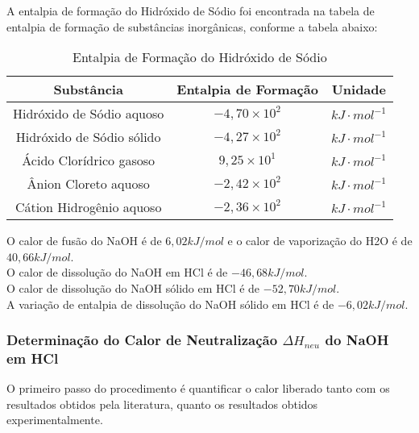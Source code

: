             \indent A entalpia de formação do Hidróxido de Sódio foi encontrada na tabela de entalpia de formação de substâncias inorgânicas, conforme a tabela abaixo:
            \begin{table}[h]
                \centering
                \begin{tabular}{|c|c|c|}
                    \hline
                    \textbf{Substância} & \textbf{Entalpia de Formação} & \textbf{Unidade} \\
                    \hline
                    Hidróxido de Sódio aquoso & $-4,70 \times 10^{2}$ & $kJ \cdot mol^{-1}$ \\
                    \hline
                    Hidróxido de Sódio sólido & $-4,27 \times 10^{2}$ & $kJ \cdot mol^{-1}$ \\
                    \hline
                    Ácido Clorídrico gasoso & $9,25 \times 10^{1}$ & $kJ \cdot mol^{-1}$ \\
                    \hline
                    Ânion Cloreto aquoso & $-2,42 \times 10^{2}$ & $kJ \cdot mol^{-1}$ \\
                    \hline
                    Cátion Hidrogênio aquoso & $-2,36 \times 10^{2}$ & $kJ \cdot mol^{-1}$ \\
                    \hline
                \end{tabular}
                \caption{Entalpia de Formação do Hidróxido de Sódio}
                \label{tab:enthalpy}
            \end{table}
        
            \indent O calor de fusão do NaOH é de $6,02 kJ/mol$ e o calor de vaporização do H2O é de $40,66 kJ/mol$.\\
            \indent O calor de dissolução do NaOH em HCl é de $- 46,68 kJ/mol$.\\
            \indent O calor de dissolução do NaOH sólido em HCl é de $- 52,70 kJ/mol$.\\
            \indent A variação de entalpia de dissolução do NaOH sólido em HCl é de $- 6,02 kJ/mol$.\\
            
            \subsubsection{Determinação do Calor de Neutralização $\Delta{H_{neu}}$ do NaOH em HCl}\label{subsubsec:determinacao_calor_neutraliza}
            \indent O primeiro passo do procedimento é quantificar o calor liberado tanto com os resultados obtidos pela literatura, quanto os resultados obtidos experimentalmente.\
            
